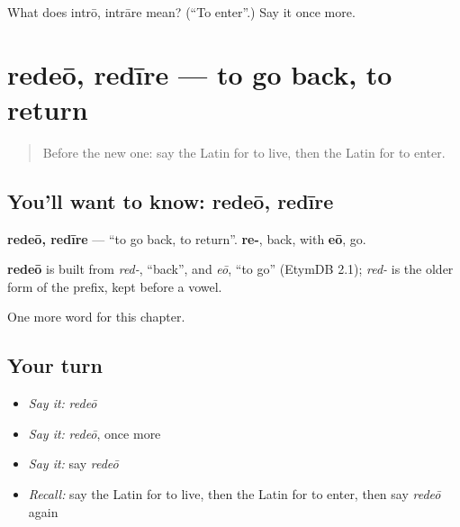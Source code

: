 \begin{tcolorbox}[breakable,colback=teal!4,colframe=teal!35!black,title={Before you move on}]
What does intrō, intrāre mean? (\textquotedblleft{}To enter\textquotedblright{}.) Say it once more.
\end{tcolorbox}
\section[redeō, redīre]{redeō, redīre — to go back, to return}

\label{lesson:LA-C78-redeo}



\begin{quote}
Before the new one: say the Latin for to live, then the Latin for to enter.
\end{quote}

\subsection*{You'll want to know: redeō, redīre}
\textbf{redeō, redīre} — \textquotedblleft{}to go back, to return\textquotedblright{}. \textbf{re-}, back, with \textbf{eō}, go.

\begin{cousinweb}
\textbf{redeō} is built from \emph{red-}, \textquotedblleft{}back\textquotedblright{}, and \emph{eō}, \textquotedblleft{}to go\textquotedblright{} (EtymDB 2.1); \emph{red-} is the older form of the prefix, kept before a vowel.
\end{cousinweb}

\begin{grammarlens}[title={What you've built}]
One more word for this chapter.
\end{grammarlens}

\subsection*{Your turn}
\begin{itemize}
\raggedright
  \item \emph{Say it:} \emph{redeō}
  \item \emph{Say it:} \emph{redeō}, once more
  \item \emph{Say it:} say \emph{redeō}
  \item \emph{Recall:} say the Latin for to live, then the Latin for to enter, then say \emph{redeō} again
\end{itemize}

